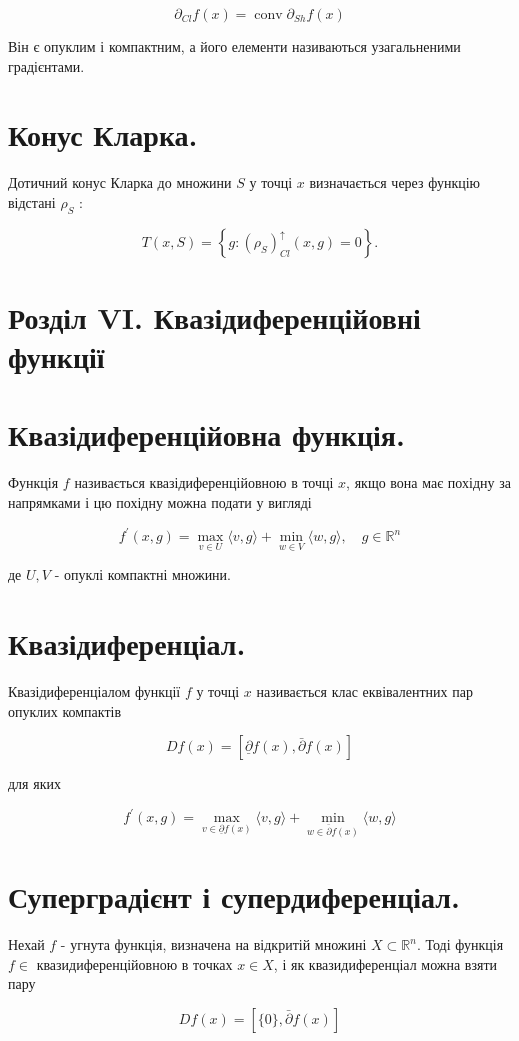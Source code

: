 \documentclass[10pt]{article}
\begin{document}
$$
\partial_{C l} f(x)=\operatorname{conv} \partial_{S h} f(x)
$$

Він є опуклим і компактним, а його елементи називаються узагальненими градієнтами.

\section*{Конус Кларка.}
Дотичний конус Кларка до множини $S$ у точці $x$ визначається через функцію відстані $\rho_{S}$ :

$$
T(x, S)=\left\{g:\left(\rho_{S}\right)_{C l}^{\uparrow}(x, g)=0\right\} .
$$

\section*{Розділ VI. Квазідиференційовні функції}
\section*{Квазідиференційовна функція.}
Функція $f$ називається квазідиференційовною в точці $x$, якщо вона має похідну за напрямками і цю похідну можна подати у вигляді

$$
f^{\prime}(x, g)=\max _{v \in U}\langle v, g\rangle+\min _{w \in V}\langle w, g\rangle, \quad g \in \mathbb{R}^{n}
$$

де $U, V$ - опуклі компактні множини.

\section*{Квазідиференціал.}
Квазідиференціалом функції $f$ у точці $x$ називається клас еквівалентних пар опуклих компактів

$$
D f(x)=[\underline{\partial} f(x), \bar{\partial} f(x)]
$$

для яких

$$
f^{\prime}(x, g)=\max _{v \in \underline{\partial} f(x)}\langle v, g\rangle+\min _{w \in \bar{\partial} f(x)}\langle w, g\rangle
$$

\section*{Суперградієнт і супердиференціал.}
Нехай $f$ - угнута функція, визначена на відкритій множині $X \subset \mathbb{R}^{n}$. Тоді функція $f \in$ квазидиференційовною в точках $x \in X$, і як квазидиференціал можна взяти пару

$$
D f(x)=[\{0\}, \bar{\partial} f(x)]
$$
\end{document}
